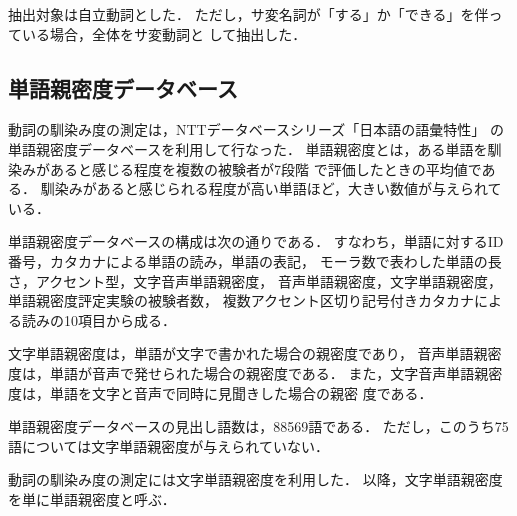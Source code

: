 抽出対象は自立動詞とした．
ただし，サ変名詞が「する」か「できる」を伴っている場合，全体をサ変動詞と
して抽出した．

\subsection{単語親密度データベース}
\label{sec:method:database}

動詞の馴染み度の測定は，NTTデータベースシリーズ「日本語の語彙特性」
の単語親密度データベースを利用して行なった．
単語親密度とは，ある単語を馴染みがあると感じる程度を複数の被験者が7段階
で評価したときの平均値である．
馴染みがあると感じられる程度が高い単語ほど，大きい数値が与えられている．

単語親密度データベースの構成は次の通りである．
すなわち，単語に対するID番号，カタカナによる単語の読み，単語の表記，
モーラ数で表わした単語の長さ，アクセント型，文字音声単語親密度，
音声単語親密度，文字単語親密度，単語親密度評定実験の被験者数，
複数アクセント区切り記号付きカタカナによる読みの10項目から成る．

文字単語親密度は，単語が文字で書かれた場合の親密度であり，
音声単語親密度は，単語が音声で発せられた場合の親密度である．
また，文字音声単語親密度は，単語を文字と音声で同時に見聞きした場合の親密
度である．

単語親密度データベースの見出し語数は，88569語である．
ただし，このうち75語については文字単語親密度が与えられていない．

動詞の馴染み度の測定には文字単語親密度を利用した．
以降，文字単語親密度を単に単語親密度と呼ぶ． 


